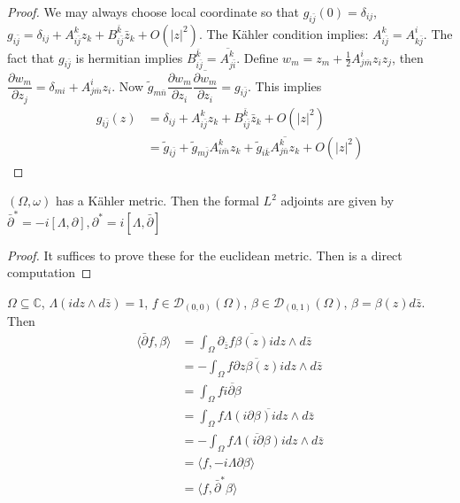 \documentclass[../main.tex]{subfiles}
\begin{document}
\begin{proof}
We may always choose local coordinate so that $g_{i\bar j}(0)=\delta_{ij}$, $g_{i\bar j}=\delta_{ij}+A^k_{i\bar j}z_k+B^{\bar k}_{i\bar j}\bar z_k+O(|z|^2)$. The K\"ahler condition implies: $A^k_{i\bar j}=A^i_{k\bar j}$. The fact that $g_{i\bar j}$ is hermitian implies $B^{\bar k}_{i\bar j}=\overline{A^k_{j\bar i}}$. Define $w_m=z_m+\frac{1}{2}A^i_{j\bar m}z_iz_j$, then $\dfrac{\partial w_m}{\partial z_j}=\delta_{mi}+A^i_{j\bar m}z_i$. Now $\tilde g_{m\bar n}\dfrac{\partial w_m}{\partial z_i}\overline{\dfrac{\partial w_m}{\partial z_i}}=g_{i\bar j}$. This implies
\begin{align*}
g_{i\bar j}(z)&=\delta_{ij}+A^k_{i\bar j}z_k+B^{\bar k}_{i\bar j}\bar z_k+O(|z|^2) \\
&=\tilde g_{i\bar j}+\tilde g_{m\bar j}A^k_{i\bar m}z_k+\tilde g_{i\bar k}\overline{A^k_{j\bar n}z_k}+O(|z|^2)
\end{align*}
\end{proof}

\begin{proposition}
$(\Omega,\omega)$ has a K\"ahler metric. Then the formal $L^2$ adjoints are given by $\bar\partial^*=-i[\Lambda,\partial],\partial^*=i[\Lambda,\bar\partial]$
\end{proposition}

\begin{proof}
It suffices to prove these for the euclidean metric. Then is a direct computation
\end{proof}

\begin{example}
$\Omega\subseteq\mathbb C$, $\Lambda(idz\wedge d\bar z)=1$, $f\in\mathcal D_{(0,0)}(\Omega)$, $\beta\in\mathcal D_{(0,1)}(\Omega)$, $\beta=\beta(z)d\bar z$. Then
\begin{align*}
\langle\bar\partial f,\beta\rangle&= \int_\Omega\partial_{\bar z}f\overline{\beta(z)}idz\wedge d\bar z\\
&=-\int_\Omega f\overline{\partial z\beta(z)}idz\wedge d\bar z \\
&=\int_\Omega f\overline{i\partial\beta} \\
&=\int_\Omega f\overline{\Lambda(i\partial\beta)idz\wedge d\bar z} \\
&=-\int_\Omega f\overline{\Lambda(i\partial\beta)}idz\wedge d\bar z \\
&=\langle f,-i\Lambda\partial\beta\rangle \\
&=\langle f,\bar\partial^*\beta\rangle
\end{align*}
\end{example}
\end{document}
